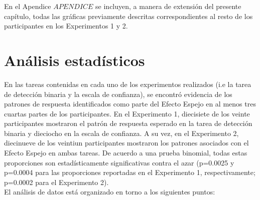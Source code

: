 En el Apendice $APENDICE$ se incluyen, a manera de extensión del presente capítulo, todas las gráficas previamente descritas correspondientes al resto de los participantes en los Experimentos 1 y 2.























\section{Análisis estadísticos}


En las tareas contenidas en cada uno de los experimentos realizados (i.e la tarea de detección binaria y la escala de confianza), se encontró evidencia de los patrones de respuesta identificados como parte del Efecto Espejo en al menos tres cuartas partes de los participantes. En el Experimento 1, diecisiete de los veinte participantes mostraron el patrón de respuesta esperado en la tarea de detección binaria y dieciocho en la escala de confianza. A su vez, en el Experimento 2, diecinueve de los veintiun participantes mostraron los patrones asociados con el Efecto Espejo en ambas tareas. De acuerdo a una prueba binomial, todas estas proporciones son estadísticamente significativas contra el azar (p=0.0025 y p=0.0004 para las proporciones reportadas en el Experimento 1, respectivamente; p=0.0002 para el Experimento 2).\\





El análisis de datos está organizado en torno a los siguientes puntos:


